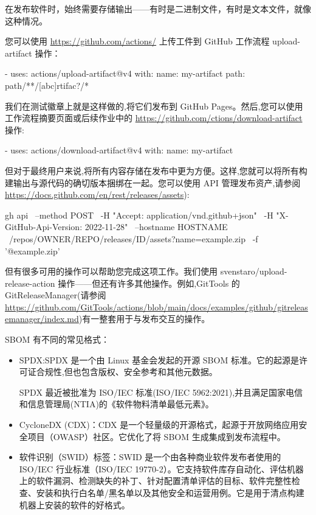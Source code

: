 
在发布软件时，始终需要存储输出——有时是二进制文件，有时是文本文件，就像这种情况。

您可以使用 \url{https://github.com/actions/} 上传工件到 GitHub 工作流程 upload-artifact 操作：

\begin{shell}
- uses: actions/upload-artifact@v4
  with:
    name: my-artifact
    path: path/**/[abc]rtifac?/*
\end{shell}

我们在测试徽章上就是这样做的,将它们发布到 GitHub Pages。然后,您可以使用工作流程摘要页面或后续作业中的 \url{https://github.com/ctions/download-artifact} 操作:

\begin{shell}
- uses: actions/download-artifact@v4
  with:
    name: my-artifact
\end{shell}

但对于最终用户来说,将所有内容存储在发布中更为方便。这样,您就可以将所有构建输出与源代码的确切版本捆绑在一起。您可以使用 API 管理发布资产,请参阅 \url{https://docs.github.com/en/rest/releases/assets}):

\begin{shell}
gh api \
  --method POST \
  -H "Accept: application/vnd.github+json" \
  -H "X-GitHub-Api-Version: 2022-11-28" \
  --hostname HOSTNAME \
  /repos/OWNER/REPO/releases/ID/assets?name=example.zip \
  -f '@example.zip'
\end{shell}

但有很多可用的操作可以帮助您完成这项工作。我们使用 svenstaro/upload-release-action 操作——但还有许多其他操作。例如,GitTools 的 GitReleaseManager(请参阅 \url{https://github.com/GitTools/actions/blob/main/docs/examples/github/gitreleasemanager/index.md})有一整套用于与发布交互的操作。

\mySubsubsection{6.8.4}{There’s more…}

SBOM 有不同的常见格式：

\begin{itemize}
\item 
SPDX:SPDX 是一个由 Linux 基金会发起的开源 SBOM 标准。它的起源是许可证合规性,但也包含版权、安全参考和其他元数据。

SPDX 最近被批准为 ISO/IEC 标准(ISO/IEC 5962:2021),并且满足国家电信和信息管理局(NTIA)的《软件物料清单最低元素》。

\item 
CycloneDX (CDX)：CDX 是一个轻量级的开源格式，起源于开放网络应用安全项目（OWASP）社区。它优化了将 SBOM 生成集成到发布流程中。

\item 
软件识别（SWID）标签：SWID 是一个由各种商业软件发布者使用的 ISO/IEC 行业标准（ISO/IEC 19770-2）。它支持软件库存自动化、评估机器上的软件漏洞、检测缺失的补丁、针对配置清单评估的目标、软件完整性检查、安装和执行白名单/黑名单以及其他安全和运营用例。它是用于清点构建机器上安装的软件的好格式。
\end{itemize}

